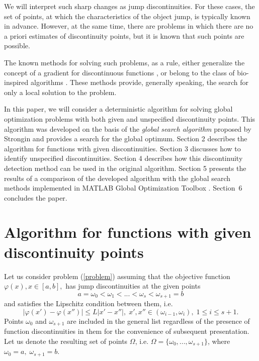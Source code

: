\documentclass[runningheads]{llncs}
\begin{document}
We will interpret such sharp changes as jump discontinuities. For these cases, the set of points, at which the characteristics of the object jump, is typically known in advance. However, at the same time, there are problems in which there are no a priori estimates of discontinuity points, but it is known that such points are possible.

The known methods for solving such problems, as a rule, either generalize the concept of a gradient for discontinuous functions \cite{Batukhtin1993,Batukhtin1998,Moreau2000}, or belong to the class of bio-inspired algorithms \cite{Ban2019,ZhangXu}. These methods provide, generally speaking, the search for only a local solution to the problem.

In this paper, we will consider a deterministic algorithm for solving global optimization problems with both given and unspecified discontinuity points. This algorithm was developed on the basis of the \textit{global search algorithm} proposed by Strongin \cite{Strongin2000} and provides a search for the global optimum. Section 2 describes the algorithm for functions with given discontinuities. Section 3 discusses how to identify unspecified discontinuities. Section 4 describes how this discontinuity detection method can be used in the original algorithm. Section 5 presents the results of a comparison of the developed algorithm with the global search methods implemented in MATLAB Global Optimization Toolbox \cite{MatlabOTB}. Section~6 concludes the paper. 

\section{Algorithm for functions with given discontinuity points}

Let us consider problem (\ref{problem}) assuming that the objective function $\varphi(x), x\in[a,b],$ has jump discontinuities at the given points
\begin{equation}\label{points}
a = \omega_0 <\omega_1 < ... <\omega_s < \omega_{s+1} = b
\end{equation}
and satisfies the Lipschitz condition between them, i.e.
\begin{equation}\label{LipschitzСondition}
\left|\varphi(x')-\varphi(x'')\right|\leq L\left|x'-x''\right|, \; x',x'' \in (\omega_{i-1},\omega_{i}), \; 1 \leq i \leq s+1.
\end{equation}
Points $\omega_{0}$ and $\omega_{s+1}$ are included in the general list regardless of the presence of function discontinuities in them for the convenience of subsequent presentation. Let us denote the resulting set of points $\Omega$, i.e. $\Omega = \{\omega_{0}, ..., \omega_{s+1}\}$, where $\omega_{0} = a, \; \omega_{s+1} = b$.
\end{document}
